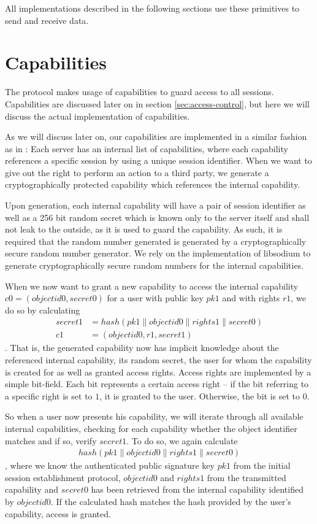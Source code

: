 All implementations described in the following sections use these primitives to send and receive data.

\section{Capabilities}
\label{sec:capabilities}

The protocol makes usage of capabilities to guard access to all sessions.
Capabilities are discussed later on in section \ref{sec:access-control}, but here we will discuss the actual implementation of capabilities.

As we will discuss later on, our capabilities are implemented in a similar fashion as in \cite{gong1989secure}:
Each server has an internal list of capabilities, where each capability references a specific session by using a unique session identifier.
When we want to give out the right to perform an action to a third party, we generate a cryptographically protected capability which references the internal capability.

Upon generation, each internal capability will have a pair of session identifier as well as a 256 bit random secret which is known only to the server itself and shall not leak to the outside, as it is used to guard the capability.
As such, it is required that the random number generated is generated by a cryptographically secure random number generator.
We rely on the implementation of libsodium to generate cryptographically secure random numbers for the internal capabilities.

When we now want to grant a new capability to access the internal capability $c0 = (objectid0, secret0)$ for a user with public key $pk1$ and with rights $r1$, we do so by calculating
\begin{align*}
    secret1 &= hash(pk1 \mathbin{\|} objectid0 \mathbin{\|} rights1 \mathbin{\|} secret0) \\
    c1 &= (objectid0, r1, secret1)
\end{align*}.
That is, the generated capability now has implicit knowledge about the referenced internal capability, its random secret, the user for whom the capability is created for as well as granted access rights.
Access rights are implemented by a simple bit-field.
Each bit represents a certain access right -- if the bit referring to a specific right is set to $1$, it is granted to the user.
Otherwise, the bit is set to $0$.

So when a user now presents his capability, we will iterate through all available internal capabilities, checking for each capability whether the object identifier matches and if so, verify $secret1$.
To do so, we again calculate
\begin{align*}
    hash(pk1 \mathbin{\|} objectid0 \mathbin{\|} rights1 \mathbin{\|} secret0)
\end{align*}, where we know the authenticated public signature key $pk1$ from the initial session establishment protocol, $objectid0$ and $rights1$ from the transmitted capability and $secret0$ has been retrieved from the internal capability identified by $objectid0$.
If the calculated hash matches the hash provided by the user's capability, access is granted.

